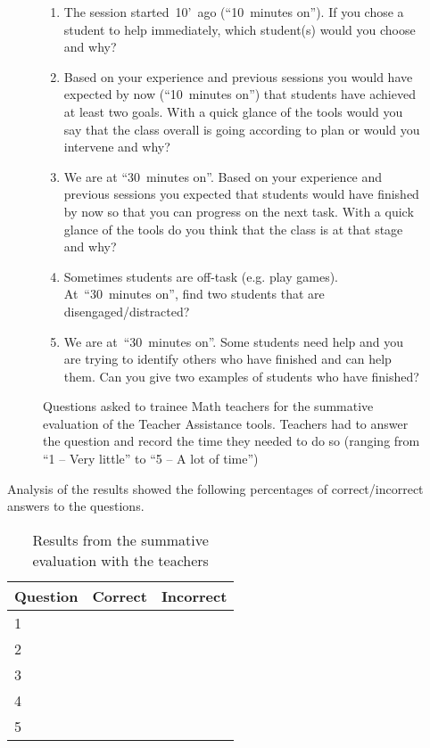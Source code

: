 \begin{figure}[htbp]
  \centering
  \begin{enumerate}
  \item The session started~10’~ago (“10~minutes on”). If you chose a
    student to help immediately, which student(s) would you choose and
    why?
  \item Based on your experience and previous sessions you would have
    expected by now (“10~minutes on”) that students have achieved at
    least two goals. With a quick glance of the tools would you say
    that the class overall is going according to plan or would you
    intervene and why?
  \item We are at “30~minutes on”. Based on your experience and
    previous sessions you expected that students would have finished
    by now so that you can progress on the next task. With a quick
    glance of the tools do you think that the class is at that stage
    and why?
  \item Sometimes students are off-task (e.g. play
    games). At~“30~minutes on”, find two students that are
    disengaged/distracted?
  \item We are at~“30~minutes on”. Some students need help and you are
    trying to identify others who have finished and can help them. Can
    you give two examples of students who have finished? 
  \end{enumerate}
  \caption{Questions asked to trainee Math teachers for the summative
    evaluation of the Teacher Assistance tools. Teachers had to answer
    the question and record the time they needed to do so (ranging
    from ``1 -- Very little'' to ``5 -- A lot of time'')} 
  \label{fig:questions-pgce}
\end{figure}

Analysis of the results showed the following percentages of
correct/incorrect answers to the questions. 

\begin{table}[htbp]
  \centering
  \begin{tabular}{|p{2cm}|p{5cm}|p{5cm}|}
    \hline
    Question & Correct & Incorrect \\
    \hline
    1 & & \\
    \hline
    2 & & \\
    \hline
    3 & & \\
    \hline
    4 & & \\
    \hline
    5 & & \\
    \hline    
  \end{tabular}
  \caption{Results from the summative evaluation with the teachers}
  \label{tab:results-pgce}
\end{table}

